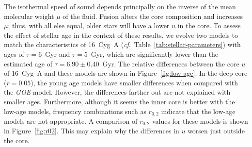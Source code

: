 The isothermal speed of sound depends principally on the inverse of the mean molecular weight $\mu$ of the fluid. 
Fusion alters the core composition and increases $\mu$; thus, with all else equal, older stars will have a lower $u$ in the core. 
To assess the effect of stellar age in the context of these results, we evolve two models to match the characteristics of 16~Cyg~A (\emph{cf}.~Table~\ref{tab:stellar-parameters}) with ages of ${\tau=6}$~Gyr and ${\tau=5}$~Gyr, which are significantly lower than the estimated age of ${\tau=6.90\pm 0.40}$~Gyr. 
The relative differences between the core ${u}$ of 16~Cyg~A and these models are shown in Figure~\ref{fig:low-age}. 
In the deep core (${r=0.05}$), the young age models have smaller differences when compared with the \emph{GOE} model. 
However, the differences farther out are not explained with smaller ages. 
Furthermore, although it seems the inner core is better with the low-age models, frequency combinations such as ${r_{0,2}}$ \citep{2003A&A...411..215R} indicate that the low-age models are not appropriate. 
A comparison of ${r_{0,2}}$ values for these models is shown in Figure~\ref{fig:r02}.
This may explain why the differences in ${u}$ worsen just outside the core.




%
%
%
%

